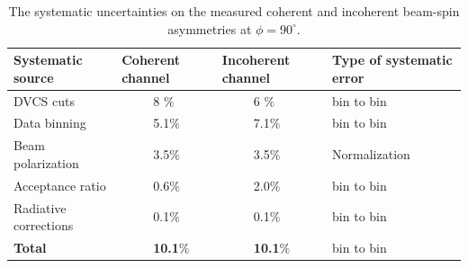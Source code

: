 \begin {table}[!h]
\begin{center}
\begin{tabular}{|l|l|l|l|}
\hline
Systematic source &  Coherent channel  & Incoherent channel &Type of systematic 
error\\
\hline
DVCS cuts & ~~~~~8 $\%$ &  ~~~~~6 $\%$ & bin to bin\\
\hline
Data binning & ~~~~~5.1$\%$ & ~~~~~7.1$\%$ &bin to bin\\
\hline
Beam polarization &  ~~~~~3.5$\%$ &  ~~~~~3.5$\%$& Normalization\\
\hline
Acceptance ratio &  ~~~~~0.6$\%$ &  ~~~~~2.0$\%$ &bin to bin\\
\hline
Radiative corrections &  ~~~~~0.1$\%$ & ~~~~~0.1$\%$ & bin to bin\\
\hline
\textbf{Total} &  ~~~~~\textbf{10.1}$\%$ &   ~~~~~\textbf{10.1}$\%$ &bin to 
bin\\
\hline
\end{tabular}
\caption{The systematic uncertainties on the measured coherent and incoherent 
beam-spin asymmetries at $\phi = 90^{\circ}$.}
\label{Table:systematic_uncertainties}
\end{center}
\end{table}



